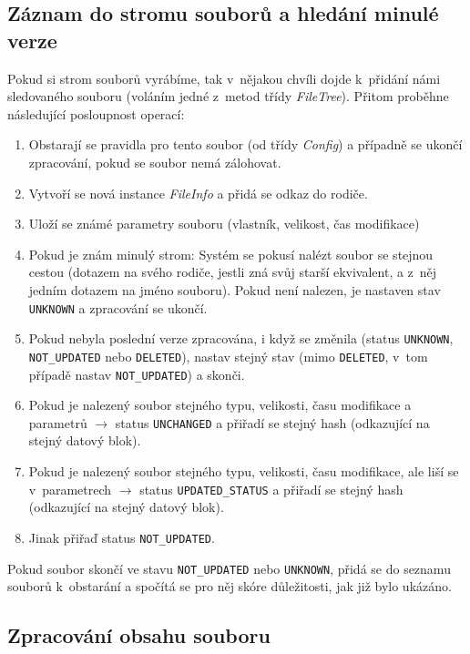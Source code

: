 \subsection{Záznam do stromu souborů a hledání minulé verze}

Pokud si strom souborů vyrábíme, tak v~nějakou chvíli dojde k~přidání námi
sledovaného souboru (voláním jedné z~metod třídy {\it FileTree}). Přitom proběhne
následující posloupnost operací:
\begin{enumerate}
	\item Obstarají se pravidla pro tento soubor (od třídy {\it Config})
	a případně se ukončí zpracování, pokud se soubor nemá zálohovat.
	\item Vytvoří se nová instance {\it FileInfo} a přidá se odkaz do rodiče.
	\item Uloží se známé parametry souboru (vlastník, velikost, čas modifikace)
	\item Pokud je znám minulý strom: Systém se pokusí nalézt soubor se
	stejnou cestou (dotazem na svého rodiče, jestli zná svůj starší
	ekvivalent, a z~něj jedním dotazem na jméno souboru). Pokud není nalezen,
	je nastaven stav \texttt{UNKNOWN} a zpracování se ukončí.
	\item Pokud nebyla poslední verze zpracována, i když se změnila (status
	\texttt{UNKNOWN}, \texttt{NOT\_UPDATED} nebo \texttt{DELETED}), nastav
	stejný stav (mimo \texttt{DELETED}, v~tom případě nastav
	\texttt{NOT\_UPDATED}) a skonči.
	\item Pokud je nalezený soubor stejného typu, velikosti, času modifikace
	a parametrů $\rightarrow$ status \texttt{UNCHANGED} a přiřadí se stejný hash
	(odkazující na stejný datový blok).
	\item Pokud je nalezený soubor stejného typu, velikosti, času modifikace,
	ale liší se v~parametrech $\rightarrow$ status \texttt{UPDATED\_STATUS}
	a přiřadí se stejný hash (odkazující na stejný datový blok).
	\item Jinak přiřaď status \texttt{NOT\_UPDATED}.
\end{enumerate}

Pokud soubor skončí ve stavu \texttt{NOT\_UPDATED} nebo \texttt{UNKNOWN}, přidá
se do seznamu souborů k~obstarání a spočítá se pro něj skóre důležitosti, jak
již bylo ukázáno.

\subsection{Zpracování obsahu souboru}

